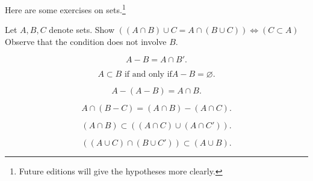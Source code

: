 

Here are some exercises on sets.\footnote{Future editions will give the hypotheses more clearly.}

\begin{exercise}
Let $A, B, C$ denote sets.
Show $((A \cap B) \cup C = A \cap (B \cup C)) \iff (C \subset A)$
Observe that the condition does not involve $B$.
\end{exercise}

\begin{exercise}
\[
  A - B = A \cap B'.
\]
\end{exercise}
\begin{exercise}
\[
  A \subset B \text{ if and only if} A - B = \varnothing.
\]
\end{exercise}
\begin{exercise}
\[
  A - (A - B) = A \cap B.
\]
\end{exercise}
\begin{exercise}
\[
  A \cap (B - C) = (A \cap B) - (A \cap C).
\]
\end{exercise}
\begin{exercise}
\[
  (A \cap B) \subset ((A \cap C) \cup (A \cap C')).
\]
\end{exercise}
\begin{exercise}
\[
  ((A \cup C) \cap (B \cup C')) \subset (A \cup B).
\]
\end{exercise}

\blankpage
